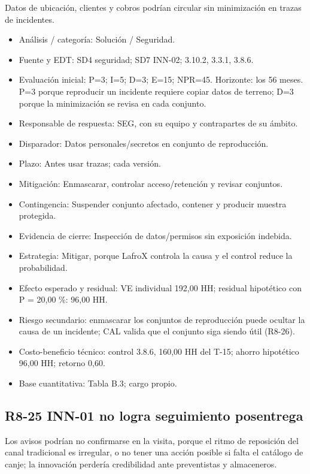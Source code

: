 Datos de ubicación, clientes y cobros podrían circular sin minimización en trazas de incidentes.

\begin{itemize}[leftmargin=*,itemsep=3pt]
\item Análisis / categoría: Solución / Seguridad.
\item Fuente y EDT: SD4 seguridad; SD7 INN-02; 3.10.2, 3.3.1, 3.8.6.
\item Evaluación inicial: P=3; I=5; D=3; E=15; NPR=45. Horizonte: los 56 meses. P=3 porque reproducir un incidente requiere copiar datos de terreno; D=3 porque la minimización se revisa en cada conjunto.
\item Responsable de respuesta: SEG, con su equipo y contrapartes de su ámbito.
\item Disparador: Datos personales/secretos en conjunto de reproducción.
\item Plazo: Antes usar trazas; cada versión.
\item Mitigación: Enmascarar, controlar acceso/retención y revisar conjuntos.
\item Contingencia: Suspender conjunto afectado, contener y producir muestra protegida.
\item Evidencia de cierre: Inspección de datos/permisos sin exposición indebida.
\item Estrategia: Mitigar, porque LafroX controla la causa y el control reduce la probabilidad.
\item Efecto esperado y residual: VE individual 192,00 HH; residual hipotético con P = 20,00 \%: 96,00 HH.
\item Riesgo secundario: enmascarar los conjuntos de reproducción puede ocultar la causa de un incidente; CAL valida que el conjunto siga siendo útil (R8-26).
\item Costo-beneficio técnico: control 3.8.6, 160,00 HH del T-15; ahorro hipotético 96,00 HH; retorno 0,60.
\item Base cuantitativa: Tabla B.3; cargo propio.
\end{itemize}

\subsection*{R8-25 \textemdash{} INN-01 no logra seguimiento posentrega}

Los avisos podrían no confirmarse en la visita, porque el ritmo de reposición del canal tradicional es irregular, o no tener una acción posible si falta el catálogo de canje; la innovación perdería credibilidad ante preventistas y almaceneros.

